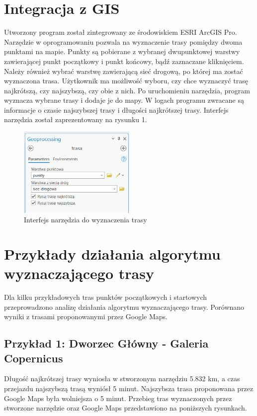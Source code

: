 \documentclass{article}
\begin{document}
\section{Integracja z GIS}
Utworzony program został zintegrowany ze środowiskiem ESRI ArcGIS Pro. Narzędzie w oprogramowaniu pozwala na wyznaczenie trasy pomiędzy dwoma punktami na mapie. 
Punkty są pobierane z wybranej dwupunktowej warstwy zawierającej punkt początkowy i punkt końcowy, bądź zaznaczane kliknięciem. Należy również wybrać warstwę zawierającą sieć drogową, po której ma zostać wyznaczona trasa. Użytkownik ma możliwość wyboru, czy chce wyznaczyć trasę najkrótszą, czy najszybszą, czy obie z nich. Po uruchomieniu narzędzia, program wyznacza wybrane trasy i dodaje je do mapy. W logach programu zwracane są informacje o czasie najszybszej trasy i długości najkrótszej trasy. Interfejs narzędzia został zaprezentowany na rysunku 1.

\begin{figure}[H]
    \centering
    \includegraphics[width=0.5\textwidth]{img/narzedzie-interfejs-trasa.png}
    \caption{Interfejs narzędzia do wyznaczenia trasy}
\end{figure}

\section{Przykłady działania algorytmu wyznaczającego trasy}
Dla kilku przykładowych tras punktów początkowych i startowych przeprowadzono analizę działania algorytmu wyznaczającego trasy. Porównano wyniki z trasami proponowanymi przez Google Maps.

\newpage
\subsection{Przykład 1: Dworzec Główny - Galeria Copernicus}
Długość najkrótszej trasy wyniosła w stworzonym narzędziu 5.832 km, a czas przejazdu najszybszą trasą wyniósł 5 minut. Najszybsza trasa proponowana przez Google Maps była wolniejsza o 5 minut. 
Przebieg tras wyznaczonych przez stworzone narzędzie oraz Google Maps przedstawiono na poniższych rysunkach.
\end{document}
